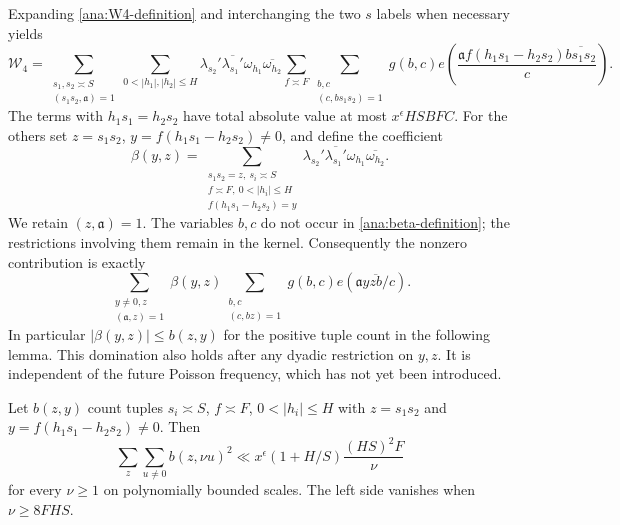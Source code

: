 Expanding \eqref{ana:W4-definition} and interchanging the two
$s$ labels when necessary yields
\begin{equation}\label{ana:W4-expansion}
 \mathcal W_4=
 \sum_{\substack{s_1,s_2\asymp S\\(s_1s_2,\mathfrak{a})=1}}
 \sum_{0<|h_1|,|h_2|\le H}\lambda_{s_2}'\overline{\lambda_{s_1}'}
       \omega_{h_1}\overline{\omega_{h_2}}
 \sum_{f\asymp F}\sum_{\substack{b,c\\(c,bs_1s_2)=1}}
 g(b,c)e\left(\frac{\mathfrak{a}f(h_1s_1-h_2s_2)\overline{bs_1s_2}}c\right).
\end{equation}
The terms with $h_1s_1=h_2s_2$ have total absolute value at most
$x^\epsilon HSBFC$. For the others set
$z=s_1s_2$, $y=f(h_1s_1-h_2s_2)\ne0$, and define the coefficient
\begin{equation}\label{ana:beta-definition}
 \beta(y,z)=
 \sum_{\substack{s_1s_2=z,\ s_i\asymp S\\
       f\asymp F,\ 0<|h_i|\le H\\
       f(h_1s_1-h_2s_2)=y}}
 \lambda_{s_2}'\overline{\lambda_{s_1}'}
       \omega_{h_1}\overline{\omega_{h_2}}.
\end{equation}
We retain $(z,\mathfrak{a})=1$. The variables $b,c$ do not occur in
\eqref{ana:beta-definition}; the restrictions involving them remain
in the kernel. Consequently the nonzero contribution is exactly
\begin{equation}\label{ana:off-diagonal-kernel}
 \sum_{\substack{y\ne0,z\\(\mathfrak{a},z)=1}}\beta(y,z)
 \sum_{\substack{b,c\\(c,bz)=1}}g(b,c)
                         e(\mathfrak{a}y\overline{zb}/c).
\end{equation}
In particular $|\beta(y,z)|\le b(z,y)$ for the positive tuple count
in the following lemma. This domination also holds after any dyadic
restriction on $y,z$. It is independent of the future Poisson
frequency, which has not yet been introduced.

\begin{lemma}\label{ana:multiplicity}
Let $b(z,y)$ count tuples
$s_i\asymp S$, $f\asymp F$, $0<|h_i|\le H$ with
$z=s_1s_2$ and $y=f(h_1s_1-h_2s_2)\ne0$. Then
\begin{equation}
 \sum_z\sum_{u\ne0}b(z,\nu u)^2
 \ll x^\epsilon(1+H/S)\frac{(HS)^2F}{\nu}
 \label{ana:multiplicity-bound}
\end{equation}
for every $\nu\ge1$ on polynomially bounded scales. The left side
vanishes when $\nu\ge8FHS$.
\end{lemma}

